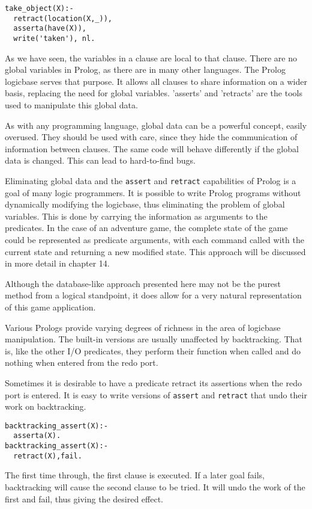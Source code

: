 \begin{verbatim}
take_object(X):-  
  retract(location(X,_)),
  asserta(have(X)),
  write('taken'), nl.
\end{verbatim}
As we have seen, the variables in a clause are local to that clause. There are
no global variables in Prolog, as there are in many other languages. The Prolog
logicbase serves that purpose. It allows all clauses to share information on a
wider basis, replacing the need for global variables. 'asserts' and 'retracts'
are the tools used to manipulate this global data.

As with any programming language, global data can be a powerful concept, easily
overused. They should be used with care, since they hide the communication of
information between clauses. The same code will behave differently if the global
data is changed. This can lead to hard-to-find bugs.

Eliminating global data and the \verb'assert' and \verb'retract' capabilities of
Prolog is a goal of many logic programmers. It is possible to write Prolog
programs without dynamically modifying the logicbase, thus eliminating the
problem of global variables. This is done by carrying the information as
arguments to the predicates. In the case of an adventure game, the complete
state of the game could be represented as predicate arguments, with each command
called with the current state and returning a new modified state. This approach
will be discussed in more detail in chapter 14.

Although the database-like approach presented here may not be the purest method
from a logical standpoint, it does allow for a very natural representation of
this game application.

Various Prologs provide varying degrees of richness in the area of logicbase
manipulation. The built-in versions are usually unaffected by backtracking. That
is, like the other I/O predicates, they perform their function when called and
do nothing when entered from the redo port.

Sometimes it is desirable to have a predicate retract its assertions when the
redo port is entered. It is easy to write versions of \verb'assert' and
\verb'retract' that undo their work on backtracking.

\begin{verbatim}
backtracking_assert(X):-  
  asserta(X).
backtracking_assert(X):-
  retract(X),fail.
\end{verbatim}
The first time through, the first clause is executed. If a later goal fails,
backtracking will cause the second clause to be tried. It will undo the work of
the first and fail, thus giving the desired effect.

